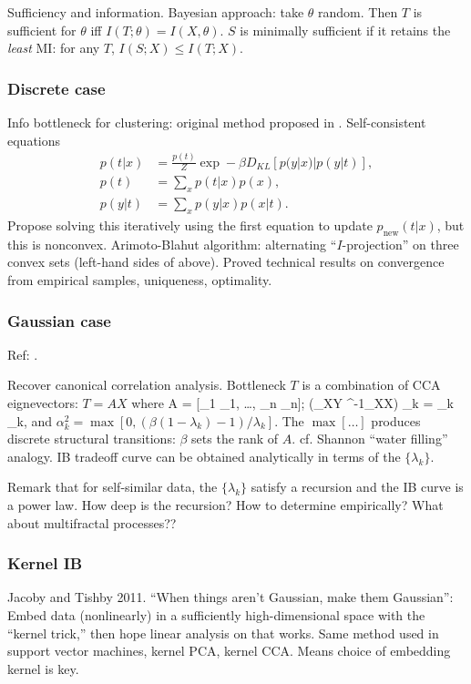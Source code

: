 \documentclass[notitlepage,openany,11pt]{report}
\theoremstyle{plain}%
\numberwithin{equation}{section}
\begin{document}
Sufficiency and information. Bayesian approach: take $\theta$ random. Then $T$ is sufficient for $\theta$ iff $I(T;\theta) = I(X, \theta)$. $S$ is minimally sufficient if it retains the \emph{least} MI: for any $T$, $I(S;X) \leq I(T;X)$.

\subsubsection{Discrete case} 
Info bottleneck for clustering: original method proposed in \cite{TishbyEtAl:99}. Self-consistent equations
\begin{align*}
p(t|x) &= \frac{p(t)}{Z} \exp -\beta D_{KL}[p(y|x) | p(y|t)], \\
p(t) &= \sum_{x} p(t|x) p(x), \\
p(y|t) &= \sum_{x} p(y|x) p(x|t).
\end{align*}
Propose solving this iteratively using the first equation to update $p_{\text{new}}(t|x)$, but this is nonconvex. Arimoto-Blahut algorithm: alternating ``$I$-projection'' on three convex sets (left-hand sides of above). Proved technical results on convergence from empirical samples, uniqueness, optimality. 

\subsubsection{Gaussian case} 

Ref: \cite{ChechikEtAl:05}. 

Recover canonical correlation analysis. Bottleneck $T$ is a combination of CCA eignevectors: $T=AX$ where
\be
A = [\alpha_{1} _{1}, \ldots, \alpha_{n} _{n}]; \qquad (\Sigma_{XY} \Sigma^{-1}_{XX}) _{k} = \lambda_{k} _{k},
\ee
and $\alpha_{k}^{2} = \max[0, (\beta(1-\lambda_{k}) -1 )/\lambda_{k}]$. The $\max[\ldots]$ produces discrete structural transitions: $\beta$ sets the rank of $A$. cf. Shannon ``water filling'' analogy. IB tradeoff curve can be obtained analytically in terms of the $\{ \lambda_{k} \}$. 

Remark that for self-similar data, the $\{ \lambda_{k} \}$ satisfy a recursion and the IB curve is a power law. How deep is the recursion? How to determine empirically? What about multifractal processes??

\subsubsection{Kernel IB} Jacoby and Tishby 2011. ``When things aren't Gaussian, make them Gaussian'': Embed data (nonlinearly) in a sufficiently high-dimensional space with the ``kernel trick,'' then hope linear analysis on that works. Same method used in support vector machines, kernel PCA, kernel CCA. Means choice of embedding kernel is key.
\end{document}
